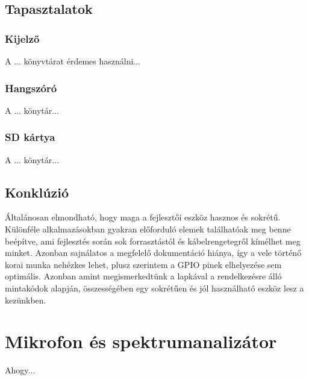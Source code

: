 \documentclass[12pt,a4paper]{article}
\begin{document}
    \subsection{Tapasztalatok}
      \subsubsection{Kijelző}
      A ... könyvtárat érdemes használni...

      \subsubsection{Hangszóró}
      A ... könytár...

      \subsubsection{SD kártya}
      A ... könytár...

    \subsection{Konklúzió}
      Általánosan elmondható, hogy maga a fejlesztői eszköz hasznos és sokrétű. Különféle alkalmazásokban gyakran előforduló elemek találhatóak meg benne beépítve, ami fejlesztés során sok forrasztástól és kábelrengetegről kímélhet meg minket.
      Azonban sajnálatos a megfelelő dokumentáció hiánya, így a vele történő korai munka nehézkes lehet, plusz szerintem a GPIO pinek elhelyezése sem optimális.
      Azonban amint megismerkedtünk a lapkával a rendelkezésre álló mintakódok alapján, összességében egy sokrétűen és jól használható eszköz lesz a kezünkben.

  \section{Mikrofon és spektrumanalizátor}
    Ahogy...
\end{document}
